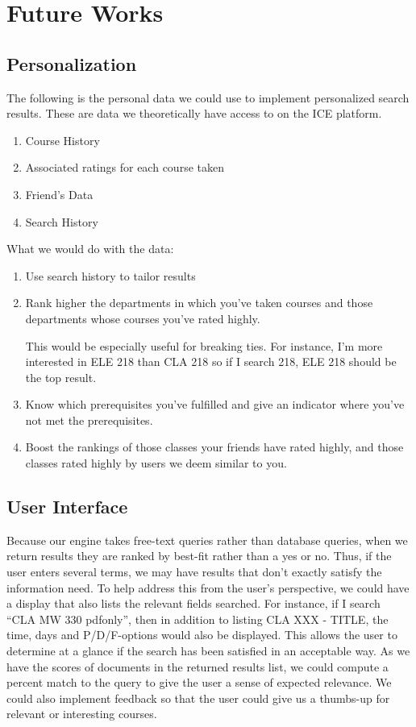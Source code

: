 \documentclass[12pt,letterpaper]{article}
\begin{document}
\section{Future Works}

\subsection{Personalization}

The following is the personal data we could use to implement personalized search results. These are data we theoretically have access to on the ICE platform.
\begin{enumerate}
\item Course History
\item Associated ratings for each course taken
\item Friend's Data
\item Search History
\end{enumerate}
What we would do with the data:
\begin{enumerate}
\item Use search history to tailor results

\item Rank higher the departments in which you've taken courses and those departments whose courses you've rated highly. 

This would be especially useful for breaking ties. For instance, I'm more interested in ELE 218 than CLA 218 so if I search 218, ELE 218 should be the top result. 

\item Know which prerequisites you've fulfilled and give an indicator where you've not met the prerequisites.

\item Boost the rankings of those classes your friends have rated highly, and those classes rated highly by users we deem similar to you.

\end{enumerate}

	
\subsection{User Interface}
Because our engine takes free-text queries rather than database queries, when we return results they are ranked by best-fit rather than a yes or no. Thus, if the user enters several terms, we may have results that don't exactly satisfy the information need.
To help address this from the user's perspective, we could have a display that also lists the relevant fields searched. For instance, if I search ``CLA MW 330 pdfonly'', then in addition to listing CLA XXX - TITLE, the time, days and P/D/F-options would also be displayed. This allows the user to determine at a glance if the search has been satisfied in an acceptable way. 
As we have the scores of documents in the returned results list, we could compute a percent match to the query to give the user a sense of expected relevance. We could also implement feedback so that the user could give us a thumbs-up for relevant or interesting courses. 
\end{document}
